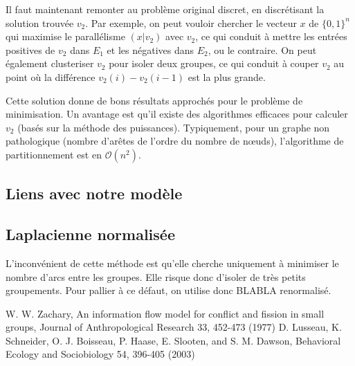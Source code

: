 \documentclass[12pt]{article}
\begin{document}
Il faut maintenant remonter au problème original discret, en
discrétisant la solution trouvée $v_2$. Par exemple, on peut vouloir
chercher le vecteur $x$ de $\{0,1\}^n$ qui maximise le parallélisme
$(x|v_2)$ avec $v_2$, ce qui conduit à mettre les entrées positives de
$v_2$ dans $E_1$ et les négatives dans $E_2$, ou le contraire. On peut
également clusteriser $v_2$ pour isoler deux groupes, ce qui conduit à
couper $v_2$ au point où la différence $v_2(i) - v_2(i-1)$ est la plus
grande.

Cette solution donne de bons résultats approchés pour le problème de
minimisation. Un avantage est qu'il existe des algorithmes efficaces
pour calculer $v_2$ (basés sur la méthode des
puissances). Typiquement, pour un graphe non pathologique (nombre
d'arêtes de l'ordre du nombre de n\oe uds), l'algorithme de
partitionnement est en $\mathcal O(n^2)$.

\subsection{Liens avec notre modèle}

\subsection{Laplacienne normalisée}
L'inconvénient de cette méthode est qu'elle cherche uniquement à
minimiser le nombre d'arcs entre les groupes. Elle risque donc
d'isoler de très petits groupements. Pour pallier à ce défaut, on
utilise donc BLABLA renormalisé.

\clearpage
\begin{thebibliography}{2}
 W. W. Zachary, An information flow model for conflict and fission in small groups, Journal of Anthropological Research 33, 452-473 (1977)
 D. Lusseau, K. Schneider, O. J. Boisseau, P. Haase, E. Slooten, and S. M. Dawson, Behavioral Ecology and Sociobiology 54, 396-405 (2003)
\end{thebibliography}
\end{document}
